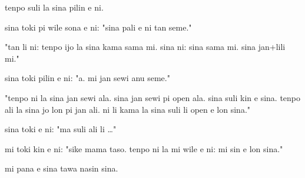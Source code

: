 \documentclass{article}
\begin{document}
tenpo suli la sina pilin e ni.

sina toki pi wile sona e ni: "sina pali e ni tan seme."

"tan li ni: tenpo ijo la sina kama sama mi. sina ni: sina sama mi. sina jan+lili mi."

sina toki pilin e ni: "a. mi jan sewi anu seme."

"tenpo ni la sina jan sewi ala. sina jan sewi pi open ala. sina suli kin e sina. tenpo ali la sina jo lon pi jan ali. ni li kama la sina suli li open e lon sina."

sina toki e ni: "ma suli ali li …"

mi toki kin e ni: "sike mama taso. tenpo ni la mi wile e ni: mi sin e lon sina."

mi pana e sina tawa nasin sina.
\end{document}
